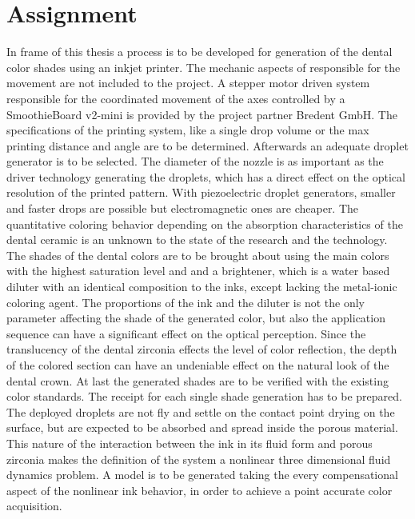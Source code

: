 \cleardoublepage
{}


\chapter{Assignment}
\label{sec:aufgabenstellung}
 In frame of this thesis a process is to be developed for generation of the dental color shades using an inkjet printer.  The mechanic aspects of responsible for the movement are not included to the project. A stepper motor driven system responsible for the coordinated movement of the axes controlled by a SmoothieBoard v2-mini is provided by the project partner Bredent GmbH. The specifications of the printing system, like a single drop volume or the max printing distance and angle are to be determined. Afterwards an adequate droplet generator is to be selected. The diameter of the nozzle is as important as the driver technology generating the droplets, which has a direct effect on the optical resolution of the printed pattern. With piezoelectric droplet generators, smaller and faster drops are possible but electromagnetic ones are cheaper. The quantitative coloring behavior depending on the absorption characteristics of the dental ceramic is an unknown to the state of the research and the technology. The shades of the dental colors are to be brought about using the main colors with the highest saturation level and and a brightener, which is a water based diluter with  an identical composition to the inks, except lacking the metal-ionic coloring agent. The proportions of the ink and the diluter is not the only parameter affecting the shade of the generated color, but also the application sequence can have a significant effect on the optical perception. Since the translucency of the dental zirconia effects the level of color reflection, the depth of the colored section can have an undeniable effect on the natural look of the dental crown. At last the generated shades are to be verified with the existing color standards. The receipt for each single shade generation has to be prepared. The deployed droplets are not fly and settle on the contact point drying on the surface, but are expected to be absorbed and spread inside the porous material. This nature of the interaction between the ink in its fluid form and porous zirconia makes the definition of the system a nonlinear three dimensional fluid dynamics problem. A model is to be generated taking the every compensational aspect of the nonlinear ink behavior, in order to achieve a point accurate color acquisition.
 
